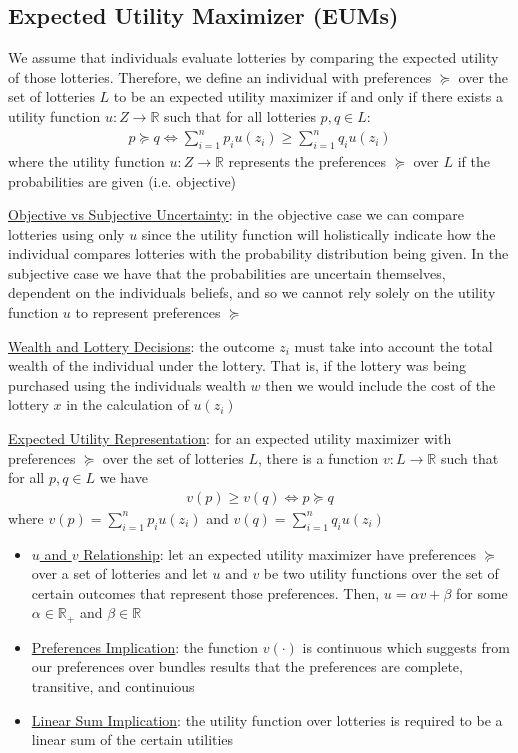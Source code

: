\documentclass{article}
\begin{document}
\subsection{Expected Utility Maximizer (EUMs)}
We assume that individuals evaluate lotteries by comparing the expected utility of those lotteries. Therefore, we define an individual with preferences $\succeq$ over the set of lotteries $L$ to be an expected utility maximizer if and only if there exists a utility function $u: Z \rightarrow \mathbb{R}$ such that for all lotteries $p,q \in L$:
\begin{gather*}
  p \succeq q \Leftrightarrow \sum_{i=1}^{n} p_{i}u(z_{i}) \geq \sum_{i=1}^{n} q_{i}u(z_{i})
\end{gather*}
where the utility function $u: Z \rightarrow \mathbb{R}$ represents the preferences $\succeq$ over $L$ if the probabilities are given (i.e. objective)
\par \vspace{0.3em}
  \underline{Objective vs Subjective Uncertainty}: in the objective case we can compare lotteries using only $u$ since the utility function will holistically indicate how the individual compares lotteries with the probability distribution being given. In the subjective case we have that the probabilities are uncertain themselves, dependent on the individuals beliefs, and so we cannot rely solely on the utility function $u$ to represent preferences $\succeq$
  \par
  \underline{Wealth and Lottery Decisions}: the outcome $z_{i}$ must take into account the total wealth of the individual under the lottery. That is, if the lottery was being purchased using the individuals wealth $w$ then we would include the cost of the lottery $x$ in the calculation of $u(z_{i})$
  \par
  \underline{Expected Utility Representation}: for an expected utility maximizer with preferences $\succeq$ over the set of lotteries $L$, there is a function $v: L \rightarrow \mathbb{R}$ such that for all $p,q \in L$ we have
  \begin{gather*}
    v(p) \geq v(q) \Leftrightarrow  p \succeq q
  \end{gather*}
  where $v(p) = \sum_{i=1}^{n} p_{i}u(z_{i})$ and $v(q) = \sum_{i=1}^{n} q_{i}u(z_{i})$
  \begin{itemize}
    \item  \underline{$u$ and $v$ Relationship}: let an expected utility maximizer have preferences $\succeq$ over a set of lotteries and let $u$ and $v$ be two utility functions over the set of certain outcomes that represent those preferences. Then, $u = \alpha v + \beta$ for some $\alpha \in \mathbb{R}_{+}$ and $\beta \in \mathbb{R}$
    \item  \underline{Preferences Implication}: the function $v(\cdot)$ is continuous which suggests from our preferences over bundles results that the preferences are complete, transitive, and continuious
    \item  \underline{Linear Sum Implication}: the utility function over lotteries is required to be a linear sum of the certain utilities
  \end{itemize}
\end{document}
